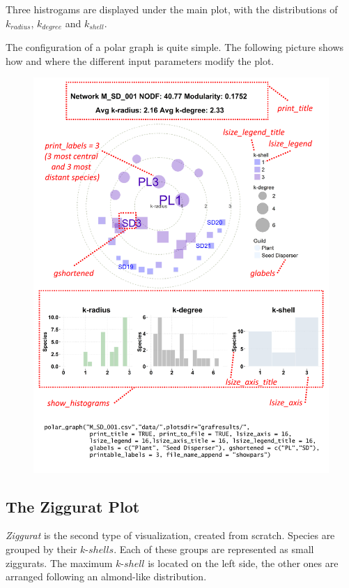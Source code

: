 \documentclass[11pt]{article}
\begin{document}
Three histrogams are displayed under the main plot, with the distributions of $k_{radius}$, $k_{degree}$ and $k_{shell}$. 

The configuration of a polar graph is quite simple. The following picture shows how and where the different input parameters modify the plot.

\clearpage
\begin{figure}[ht!]
\centering
\includegraphics[scale=0.75]{polar_params.pdf}
\label{fig:KMAN_polar_params}
\end{figure}

\clearpage

\subsection*{The Ziggurat Plot}
\label{the_ziggurat_plot}

\textit{Ziggurat} is the second type of visualization, created from scratch. Species are grouped by their $k$-$shells$. Each of these groups are represented as small ziggurats. The maximum $k$-$shell$ is located on the left side, the other ones are arranged following an almond-like distribution. 
\end{document}
